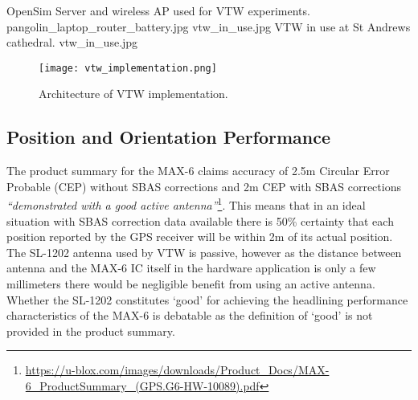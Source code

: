  {OpenSim Server and wireless AP used for VTW experiments.} {pangolin_laptop_router_battery.jpg}
       {vtw_in_use.jpg} {VTW in use at St Andrews cathedral.} {vtw_in_use.jpg}

\begin{figure}[h]
\centering
  \texttt{[image: vtw\_implementation.png]}
  \caption{Architecture of VTW implementation.}
  \label{vtw_implementation.png}
\end{figure}


\subsection{Position and Orientation Performance}

\newcommand{\ubloxcepFootnote}{\footnote{\url{https://u-blox.com/images/downloads/Product_Docs/MAX-6_ProductSummary_(GPS.G6-HW-10089).pdf}}}

\newcommand{\htconesFootnote}{\footnote{\url{http://www.htc.com/uk/smartphones/htc-one-s/}}}

\newcommand{\snapdragonFootnote}{\footnote{\url{https://www.qualcomm.com/products/snapdragon/processors/s4-s1}}}

\newcommand{\mytracksFootnote}{\footnote{\url{https://play.google.com/store/apps/details?id=com.google.android.maps.mytracks&hl=en}}}

\newcommand{\hausdorffFootnote}{\footnote{\url{http://postgis.net/docs/ST_HausdorffDistance.html}}}


The product summary for the MAX-6 claims accuracy of 2.5m Circular Error Probable (CEP) without SBAS corrections and 2m CEP with SBAS corrections \textit{``demonstrated with a good active antenna''}\ubloxcepFootnote{}. This means that in an ideal situation with SBAS correction data available there is 50\% certainty that each position reported by the GPS receiver will be within 2m of its actual position. The SL-1202 antenna used by VTW is passive, however as the distance between antenna and the MAX-6 IC itself in the hardware application is only a few millimeters there would be negligible benefit from using an active antenna. Whether the SL-1202 constitutes `good' for achieving the headlining performance characteristics of the MAX-6 is debatable as the definition of `good' is not provided in the product summary.

